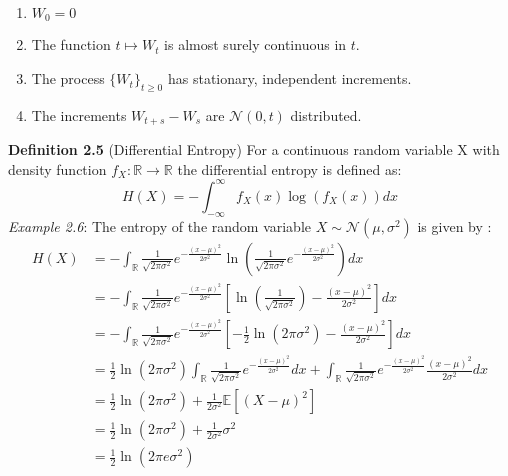 \documentclass[oneside, a4paper, onecolumn, 11pt]{article}
\begin{document}
\begin{enumerate}
    \item \( W_0 = 0 \)
    \item The function \( t \mapsto W_t \) is almost surely continuous in \( t \).
    \item The process \( \{ W_t \}_{t \geq 0} \) has stationary, independent increments.
    \item The increments \( W_{t+s} - W_s \) are \( \mathcal{N}(0, t) \) distributed.
\end{enumerate}
\textbf{Definition 2.5} (Differential Entropy) \cite{Jaynes1963}
For a continuous random variable X  with density function $f_X: \mathbb{R} \to \mathbb{R}$  the differential entropy is defined as:
\begin{equation}
    H(X) = - \int_{-\infty}^{\infty} f_X(x) \log(f_X(x))dx 
\end{equation}
\textit{Example 2.6}: The entropy of the random variable $X\sim \mathcal{N}(\mu, \sigma^2)$ is given by : 
\begin{align*}
    H(X) &= -\int_{\mathbb{R}} \frac{1}{\sqrt{2\pi\sigma^2}}e^{-\frac{(x-\mu)^2}{2\sigma^2}} \ln \left(\frac{1}{\sqrt{2\pi\sigma^2}}e^{-\frac{(x-\mu)^2}{2\sigma^2}}\right)dx\\ 
    &= -\int_{\mathbb{R}} \frac{1}{\sqrt{2\pi\sigma^2}}e^{-\frac{(x-\mu)^2}{2\sigma^2}} \left[\ln \left(\frac{1}{\sqrt{2\pi\sigma^2}}\right)- \frac{(x-\mu)^2}{2\sigma^2}\right]dx\\ 
    &= -\int_{\mathbb{R}} \frac{1}{\sqrt{2\pi\sigma^2}}e^{-\frac{(x-\mu)^2}{2\sigma^2}} \left[-\frac{1}{2}\ln \left(2\pi\sigma^2\right)- \frac{(x-\mu)^2}{2\sigma^2}\right]dx \\ 
    &= \frac{1}{2}\ln \left(2\pi\sigma^2\right) \int_{\mathbb{R}} \frac{1}{\sqrt{2\pi\sigma^2}}e^{-\frac{(x-\mu)^2}{2\sigma^2}}dx + \int_{\mathbb{R}} \frac{1}{\sqrt{2\pi\sigma^2}}e^{-\frac{(x-\mu)^2}{2\sigma^2}}\frac{(x-\mu)^2}{2\sigma^2}dx \\
    &= \frac{1}{2}\ln(2\pi\sigma^2) + \frac{1}{2\sigma^2}\mathbb{E}[(X-\mu)^2]\\
    &= \frac{1}{2}\ln(2\pi\sigma^2) + \frac{1}{2\sigma^2} \sigma^2\\
    &= \frac{1}{2} \ln(2\pi e \sigma^2) 
\end{align*}
\end{document}
